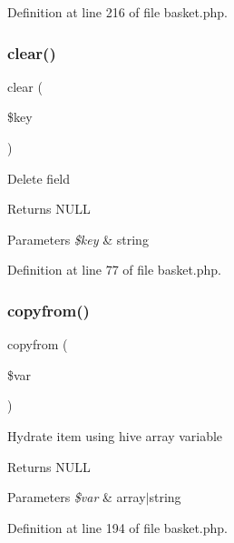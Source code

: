 Definition at line 216 of file basket.\+php.

\hypertarget{class_basket_a10a949ef75de6c82c98ac555f371ba83}{}\label{class_basket_a10a949ef75de6c82c98ac555f371ba83} 
\subsubsection{\texorpdfstring{clear()}{clear()}}
{\footnotesize\ttfamily clear (\begin{DoxyParamCaption}\item[{}]{\$key }\end{DoxyParamCaption})}

Delete field \begin{DoxyReturn}{Returns}
N\+U\+LL 
\end{DoxyReturn}

\begin{DoxyParams}{Parameters}
{\em \$key} & string \\
\hline
\end{DoxyParams}


Definition at line 77 of file basket.\+php.

\hypertarget{class_basket_a462833da5009a82b31e39d3b5db38abd}{}\label{class_basket_a462833da5009a82b31e39d3b5db38abd} 
\subsubsection{\texorpdfstring{copyfrom()}{copyfrom()}}
{\footnotesize\ttfamily copyfrom (\begin{DoxyParamCaption}\item[{}]{\$var }\end{DoxyParamCaption})}

Hydrate item using hive array variable \begin{DoxyReturn}{Returns}
N\+U\+LL 
\end{DoxyReturn}

\begin{DoxyParams}{Parameters}
{\em \$var} & array$\vert$string \\
\hline
\end{DoxyParams}


Definition at line 194 of file basket.\+php.

\hypertarget{class_basket_a4bcf54f913758fb093c35ea81fc29615}{}\label{class_basket_a4bcf54f913758fb093c35ea81fc29615} 
